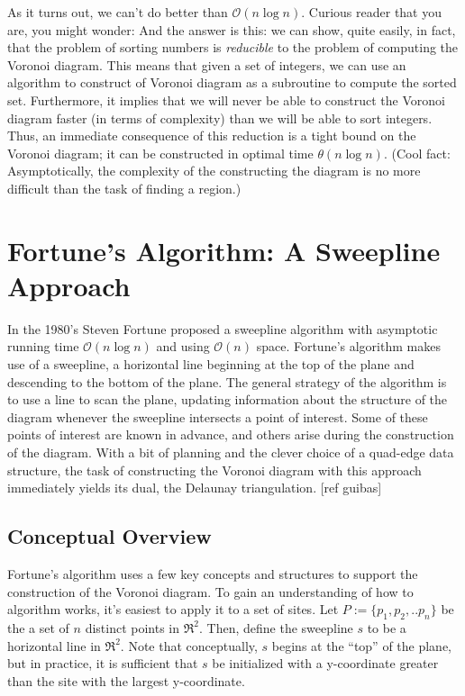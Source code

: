 \documentclass[12pt,twoside]{reedthesis}
\begin{document}
    As it turns out, we can't do better than $\mathcal{O}(n\log n)$. Curious reader that you are, you might wonder:  And the answer is this: we can show, quite easily, in fact, that the problem of sorting numbers is \emph{reducible} to the problem of computing the Voronoi diagram. This means that given a set of integers, we can use an algorithm to construct of Voronoi diagram as a subroutine to compute the sorted set. Furthermore, it implies that we will never be able to construct the Voronoi diagram faster (in terms of complexity) than we will be able to sort integers. Thus, an immediate consequence of this reduction is a tight bound on the Voronoi diagram; it can be constructed in optimal time $\theta(n\log n)$. (Cool fact: Asymptotically, the complexity of the constructing the diagram is no more difficult than the task of finding a region.)\par
  

  \section{Fortune's Algorithm: A Sweepline Approach} %
  \label{sec:fortune_s_algorithm}
    In the 1980's Steven Fortune proposed a sweepline algorithm with asymptotic running time $\mathcal{O}(n\log n)$ and using $\mathcal{O}(n)$ space. Fortune's algorithm makes use of a sweepline, a horizontal line beginning at the top of the plane and descending to the bottom of the plane. The general strategy of the algorithm is to use a line to scan the plane, updating information about the structure of the diagram whenever the sweepline intersects a point of interest. Some of these points of interest are known in advance, and others arise during the construction of the diagram. With a bit of planning and the clever choice of a quad-edge data structure, the task of constructing the Voronoi diagram with this approach immediately yields its dual, the Delaunay triangulation. [ref guibas]

  \subsection{Conceptual Overview} %
  \label{sub:conceptual_overview}
    Fortune's algorithm uses a few key concepts and structures to support the construction of the Voronoi diagram. To gain an understanding of how to algorithm works, it's easiest to apply it to a set of sites. Let $P:=\{p_{1}, p_{2}, .. p_{n}\}$ be the a set of $n$ distinct points in $\Re^{2}$. Then, define the sweepline $s$ to be a horizontal line in $\Re^{2}$. Note that conceptually, $s$ begins at the ``top'' of the plane, but in practice, it is sufficient that $s$ be initialized with a y-coordinate greater than the site with the largest y-coordinate.\par
\end{document}
